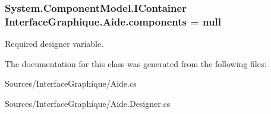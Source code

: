 \subsubsection[{\texorpdfstring{components}{components}}]{\setlength{\rightskip}{0pt plus 5cm}System.\+Component\+Model.\+I\+Container Interface\+Graphique.\+Aide.\+components = null\hspace{0.3cm}{\ttfamily [private]}}\hypertarget{class_interface_graphique_1_1_aide_a2f9eae78723058f9ba1532841f098414}{}\label{class_interface_graphique_1_1_aide_a2f9eae78723058f9ba1532841f098414}


Required designer variable. 



The documentation for this class was generated from the following files\+:\begin{DoxyCompactItemize}
\item 
Sources/\+Interface\+Graphique/Aide.\+cs\item 
Sources/\+Interface\+Graphique/Aide.\+Designer.\+cs\end{DoxyCompactItemize}
